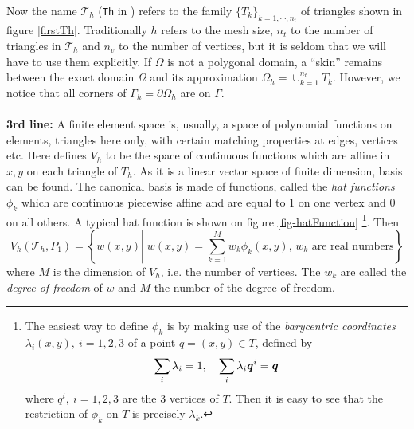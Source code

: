 \documentclass[a4paper,twoside,12pt]{book}
\def\vec#1{\mbox{\boldmath $#1$}}
\def\p{\partial}
\begin{document}
Now the name $\mathcal{T}_h$ (\texttt{Th} in \freefempp) refers to
the family $\{T_k\}_{k=1,\cdots,n_t}$ of triangles shown in figure \ref{firstTh}.
Traditionally  $h$ refers to the mesh size, $n_t$ to the number of
triangles in $\mathcal{T}_h$ and $n_v$ to the number of vertices, but it is seldom
that we will have to use them explicitly.
If $\Omega$ is not a polygonal domain, a ``skin'' remains between
the exact domain $\Omega$ and its approximation
$\Omega_h=\cup_{k=1}^{n_t}T_k$.
However, we notice that all corners of $\Gamma_h = \p\Omega_h$ are
on $\Gamma$.
\\\\
\textbf{3rd line:} A finite element space is, usually, a space of
polynomial functions on elements, triangles here only, with certain matching properties
at edges, vertices etc.  Here  defines $V_h$ to be the
space of continuous functions which are affine in $x,y$ on each triangle of $T_h$.  As it is a
linear vector space of finite dimension, basis can be found.
The canonical basis is made of functions, called the \emph{hat functions}
$\phi_k$ which are continuous piecewise affine and are equal to 1 on one vertex and 0 on all others.
A typical hat function is shown on figure \ref{fig-hatFunction}
\footnote{
The easiest way to define $\phi_k$ is by making use of the 
\emph{barycentric coordinates}
$\lambda_i(x,y),~i=1,2,3$ of a point $q=(x,y)\in T$, defined by
\[
    \sum_i\lambda_i=1,~~~\sum_i\lambda_i\vec q^i=\vec q
\]
where $q^i,~i=1,2,3$ are the 3 vertices of $T$.  Then it is easy to see that
the restriction of $\phi_k$ on $T$ is precisely $\lambda_k$.
}.
Then
\begin{equation}
V_h(\mathcal{T}_h,P_1)=\left\{w(x,y)\left|\;
w(x,y)=\sum_{k=1}^{M}w_k\phi_k(x,y),\, w_k\textrm{ are real numbers}\right.\right\}
\label{eq 2.3}\end{equation}
where $M$ is the dimension of $V_h$, i.e. the number of vertices.
The $w_k$ are called the \emph{degree of freedom} of $w$ and $M$ the number of
the degree of freedom.
\end{document}
